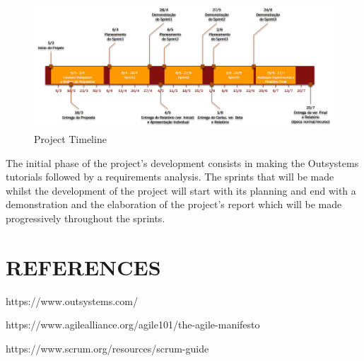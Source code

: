 \documentclass[a4paper,openright,12pt]{report}
\begin{document}
\begin{figure}[H]
  \includegraphics[width=\linewidth]{./figures/Timeline Projeto LEIC.png}
  \caption{Project Timeline}\label{fig:schedule}
\end{figure}

The initial phase of the project's development consists in making the Outsystems tutorials followed by a requirements analysis. The sprints that will be made whilst the development of the project will start with its planning and end with a demonstration and the elaboration of the project's report which will be made progressively throughout the sprints.

\section*{REFERENCES}

\par
[1] https://www.outsystems.com/ \par
[2] https://www.agilealliance.org/agile101/the-agile-manifesto \par
[3] https://www.scrum.org/resources/scrum-guide
\end{document}
